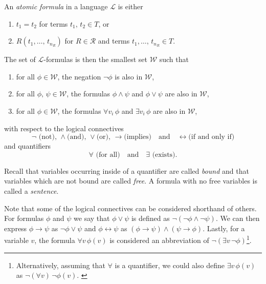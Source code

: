 \documentclass[../../main.tex]{subfiles}
\begin{document}
\begin{definition}\cite[Definition 1.1.5]{Mar02}\label{formula-def}
    An \textit{atomic formula} in a language $\mathcal{L}$ is either
    \begin{enumerate}
        \item $t_1 = t_2$ for terms $t_1,\, t_2 \in T$, or   
        \item $R(t_1,\ldots,\, t_{n_R})$ for $R \in \mathcal{R}$ and terms $t_1,\ldots,\, t_{n_R} \in T$.
    \end{enumerate}
    The set of $\mathcal{L}$-formulas is then the smallest set $\mathcal{W}$ such that
    \begin{enumerate}[label=(\roman*)]
        \item for all $\phi \in \mathcal{W}$, the negation $\lnot \phi$ is also in $\mathcal{W}$,
        \item for all $\phi,\, \psi \in \mathcal{W}$, the formulas $\phi \wedge \psi$ and $\phi \vee \psi$ are also in $\mathcal{W}$,
        \item for all $\phi \in \mathcal{W}$, the formulas $\forall v_i \, \phi$ and $\exists v_i \, \phi$ are also in $\mathcal{W}$,
    \end{enumerate}
    with respect to the logical connectives 
    $$\lnot \text{ (not), } \wedge \text{(and), } \vee \text{(or), } \rightarrow \text{(implies)}\quad \text{and}\quad \leftrightarrow \text{(if and only if)}$$
    and quantifiers $$\forall \text{ (for all)}\quad \text{and}\quad \exists \text{ (exists)}.$$
    
    Recall that variables occurring inside of a quantifier are called \textit{bound} and that variables which are not bound are called \textit{free}.
    A formula with no free variables is called a \textit{sentence}.
\end{definition}

Note that some of the logical connectives can be considered shorthand of others.
For formulas $\phi$ and $\psi$ we say that $\phi \vee \psi$ is defined as $\lnot \left(\lnot \phi \wedge \lnot \psi\right)$.
We can then express $\phi \rightarrow \psi$ as $\lnot \phi \vee \psi$ and $\phi \leftrightarrow \psi$ as $\left(\phi \rightarrow \psi\right) \wedge \left(\psi \rightarrow \phi\right)$.
Lastly, for a variable $v$, the formula $\forall v\,  \phi(v)$ is considered an abbreviation of $\lnot \left(\exists v\, \lnot \phi\right)$\footnote{
    Alternatively, assuming that $\forall$ is a quantifier, we could also define $\exists v\, \phi(v)$ as $\lnot \left(\forall v\right)\, \lnot \phi(v)$. \cite[p.23]{Cha90}
}. \cite[Remark 1.1.7]{Mar02}
\end{document}
